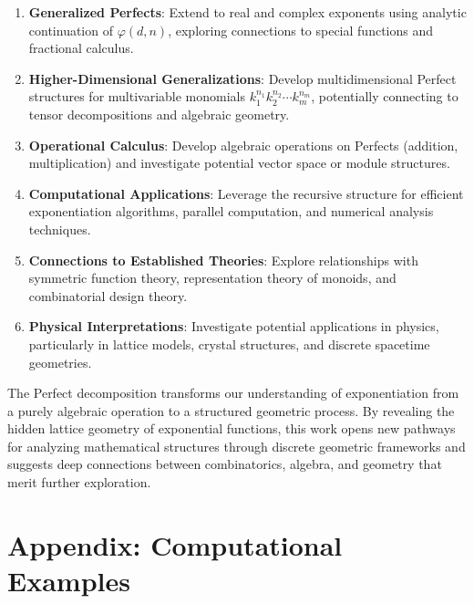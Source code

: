 \documentclass[11pt]{article}
\begin{document}
\begin{enumerate}
\item \textbf{Generalized Perfects}: Extend to real and complex exponents using analytic continuation of $\varphi(d,n)$, exploring connections to special functions and fractional calculus.

\item \textbf{Higher-Dimensional Generalizations}: Develop multidimensional Perfect structures for multivariable monomials $k_1^{n_1}k_2^{n_2}\cdots k_m^{n_m}$, potentially connecting to tensor decompositions and algebraic geometry.

\item \textbf{Operational Calculus}: Develop algebraic operations on Perfects (addition, multiplication) and investigate potential vector space or module structures.

\item \textbf{Computational Applications}: Leverage the recursive structure for efficient exponentiation algorithms, parallel computation, and numerical analysis techniques.

\item \textbf{Connections to Established Theories}: Explore relationships with symmetric function theory, representation theory of monoids, and combinatorial design theory.

\item \textbf{Physical Interpretations}: Investigate potential applications in physics, particularly in lattice models, crystal structures, and discrete spacetime geometries.
\end{enumerate}

The Perfect decomposition transforms our understanding of exponentiation from a purely algebraic operation to a structured geometric process. By revealing the hidden lattice geometry of exponential functions, this work opens new pathways for analyzing mathematical structures through discrete geometric frameworks and suggests deep connections between combinatorics, algebra, and geometry that merit further exploration.

\newpage



\appendix
\section*{Appendix: Computational Examples}\label{sec:appendix}
\end{document}
